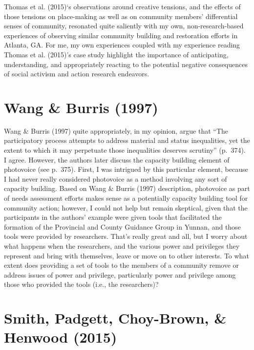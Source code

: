 \documentclass[11pt,]{tufte-handout}
\begin{document}
Thomas et al. (2015)`s observations around creative tensions, and the
effects of those tensions on place-making as well as on community
members' differential senses of community, resonated quite saliently
with my own, non-research-based experiences of observing similar
community building and restoration efforts in Atlanta, GA. For me, my
own experiences coupled with my experience reading Thomas et al.
(2015)'s case study highlight the importance of anticipating,
understanding, and appropriately reacting to the potential negative
consequences of social activism and action research endeavors.

\section{Wang \& Burris (1997)}\label{wang1997photovoice}

Wang \& Burris (1997) quite appropriately, in my opinion, argue that
``The participatory process attempts to address material and status
inequalities, yet the extent to which it may perpetuate those
inequalities deserves scrutiny'' (p.~374). I agree. However, the authors
later discuss the capacity building element of photovoice (see p.~375).
First, I was intrigued by this particular element, because I had never
really considered photovoice as a method involving any sort of capacity
building. Based on Wang \& Burris (1997) description, photovoice as part
of needs assessment efforts makes sense as a potentially capacity
building tool for community action; however, I could not help but remain
skeptical, given that the participants in the authors' example were
given tools that facilitated the formation of the Provincial and County
Guidance Group in Yunnan, and those tools were provided by researchers.
That's really great and all, but I worry about what happens when the
researchers, and the various power and privileges they represent and
bring with themselves, leave or move on to other interests. To what
extent does providing a set of tools to the members of a community
remove or address issues of power and privilege, particularly power and
privilege among those who provided the tools (i.e., the researchers)?

\section{Smith, Padgett, Choy-Brown, \& Henwood
(2015)}\label{smith2015rebuilding}
\end{document}

